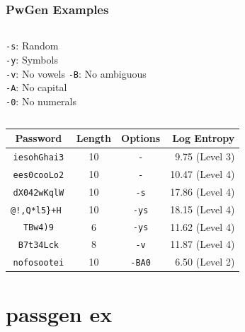 \documentclass[14pt,usenames,dvipsnames]{beamer}
\begin{document}
\begin{frame}
	\frametitle{PwGen Examples}

  \begin{columns}
    \texttt{-s}:	Random\\
    \texttt{-y}: Symbols\\
    \texttt{-v}: No vowels
    \texttt{-B}: No ambiguous\\
    \texttt{-A}: No capital\\
    \texttt{-0}: No numerals
	
	\end{columns}
	\begin{table}
		\begin{tabular}{c|c|c|r}
		\textbf{Password} & \textbf{Length} & \textbf{Options} & \textbf{Log Entropy}  \\ 
		\hline
		\hline
		
		\texttt{iesohGhai3}   & 10 & \texttt{-}    &  9.75 (Level 3)\\
		\texttt{ees0cooLo2}   & 10 & \texttt{-}    & 10.47 (Level 4)\\
		\texttt{dX042wKqlW}   & 10 & \texttt{-s}   & 17.86 (Level 4)\\
		\texttt{@!,Q*l5\}+H } & 10 & \texttt{-ys}  & 18.15 (Level 4)\\
		\texttt{TBw4)9}       &  6 & \texttt{-ys}  & 11.62 (Level 4)\\
		\texttt{B7t34Lck}     &  8 & \texttt{-v}   & 11.87 (Level 4)\\
		\texttt{nofosootei}   & 10 & \texttt{-BA0} &  6.50 (Level 2)\\
		\end{tabular}
  \end{table}

\end{frame}

\section*{passgen ex}
\end{document}
